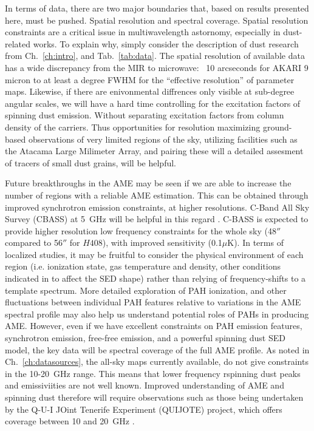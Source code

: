                 In terms of data, there are two major boundaries that, based on results presented here, must be pushed. Spatial resolution and spectral coverage.
                Spatial resolution constraints are a critical issue in multiwavelength astornomy, especially in dust-related works. To explain why, simply consider the description of dust research from Ch.~\ref{ch:intro}, and Tab.~\ref{tab:data}. The spatial resolution of available data has a wide discrepancy from the MIR to microwave: ~10 arcseconds for AKARI 9 micron to at least a degree FWHM for the ``effective resolution'' of parameter maps. Likewise, if there are enivonmental diffrences only visible at sub-degree angular scales, we will have a hard time controlling for the excitation factors of spinning dust emission. Without separating excitation factors from column density of the carriers. Thus opportunities for resolution maximizing ground-based observations of very limited regions of the sky, utilizing facilities such as the Atacama Large Milimeter Array, and pairing these will a detailed assesment of tracers of small dust grains, will be helpful.

                Future breakthroughs in the AME may be seen if we are able to increase the number of regions with a reliable AME estimation. This can be obtained through improved synchrotron emission constraints, at higher resolutions. C-Band All Sky Survey (CBASS) at 5~GHz will be helpful in this regard \citep{irfan15}. C-BASS is expected to provide higher resolution low frequency constraints for the whole sky (48$''$ compared to 56$''$ for $H408$), with improved sensitivity (0.1$\mu$K). In terms of localized studies, it may be fruitful to consider the physical environment of each region (i.e. ionization state, gas temperature and density, other conditions indicated in \cite{draine98a, ali-haimoud10} to affect the SED shape) rather than relying of frequency-shifts to a template spectrum. More detailed exploration of PAH ionization, and other fluctuations between individual PAH features relative to variations in the AME spectral profile may also help us understand potential roles of PAHs in producing AME. However, even if we have excellent constraints on PAH emission features, synchrotron emission, free-free emission, and a powerful spinning dust SED model, the key data will be spectral coverage of the full AME profile. As noted in Ch.~\ref{ch:datasources}, the all-sky maps currently available, do not give constraints in the 10-20~GHz range. This means that lower frequency rspinning dust peaks and emissiviities are not well known. Improved understanding of AME and spinning dust therefore will require observations such as those being undertaken by the Q-U-I JOint Tenerife Experiment (QUIJOTE) project, which offers coverage between 10 and 20~GHz \citep{santos15}.
